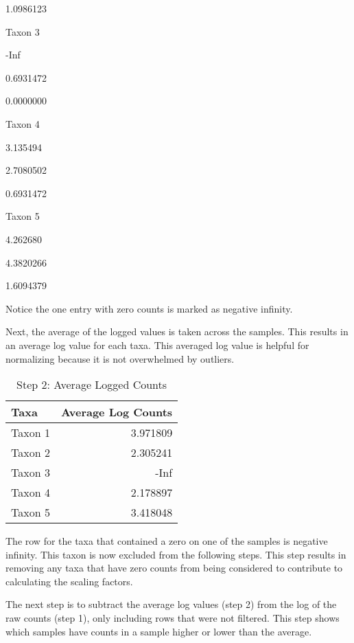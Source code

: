 \documentclass[
]{book}
\begin{document}
1.0986123

Taxon 3

-Inf

0.6931472

0.0000000

Taxon 4

3.135494

2.7080502

0.6931472

Taxon 5

4.262680

4.3820266

1.6094379

Notice the one entry with zero counts is marked as negative infinity.

Next, the average of the logged values is taken across the samples. This results in an average log value for each taxa. This averaged log value is helpful for normalizing because it is not overwhelmed by outliers.

\begin{table}

\caption{\label{tab:unnamed-chunk-22}Step 2: Average Logged Counts}
\centering
\begin{tabular}[t]{l|r}
\hline
Taxa & Average Log Counts\\
\hline
Taxon 1 & 3.971809\\
\hline
Taxon 2 & 2.305241\\
\hline
Taxon 3 & -Inf\\
\hline
Taxon 4 & 2.178897\\
\hline
Taxon 5 & 3.418048\\
\hline
\end{tabular}
\end{table}

The row for the taxa that contained a zero on one of the samples is negative infinity. This taxon is now excluded from the following steps. This step results in removing any taxa that have zero counts from being considered to contribute to calculating the scaling factors.

The next step is to subtract the average log values (step 2) from the log of the raw counts (step 1), only including rows that were not filtered. This step shows which samples have counts in a sample higher or lower than the average.
\end{document}
